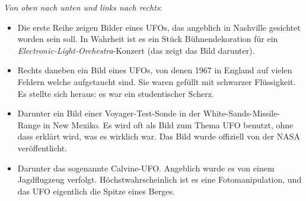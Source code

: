 \documentclass{scrartcl}
\begin{document}
\textit{Von oben nach unten und links nach rechts}:

\begin{itemize}
	\item Die erste Reihe zeigen Bilder eines UFOs, das angeblich in Nashville gesichtet worden sein soll. In Wahrheit ist es ein Stück Bühnendekoration für ein \textit{Electronic-Light-Orchestra}-Konzert (das zeigt das Bild darunter).

	\item Rechts daneben ein Bild eines UFOs, von denen 1967 in England auf vielen Feldern welche aufgetaucht sind. Sie waren gefüllt mit schwarzer Flüssigkeit. Es stellte sich heraus: es war ein studentischer Scherz.

	\item Darunter ein Bild einer Voyager-Test-Sonde in der White-Sands-Missile-Range in New Mexiko. Es wird oft als Bild zum Thema UFO benutzt, ohne dass erklärt wird, was es wirklich war. Das Bild wurde offiziell von der NASA veröffentlicht.

	\item Darunter das sogenannte Calvine-UFO. Angeblich wurde es von einem Jagdflugzeug verfolgt. Höchstwahrscheinlich ist es eine Fotomanipulation, und das UFO eigentlich die Spitze eines Berges.

\end{itemize}
\end{document}
